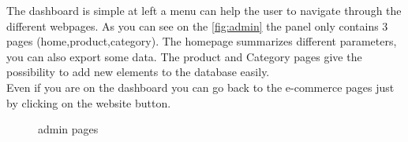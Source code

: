 \documentclass{article}
\begin{document}
The dashboard is simple at left a menu can help the user to navigate through the different webpages. As you can see on the \autoref{fig:admin} the panel only contains 3 pages (home,product,category). The homepage summarizes different parameters, you can also export some data. The product and Category pages give the possibility to add new elements to the database easily. \\

Even if you are on the dashboard you can go back to the e-commerce pages just by clicking on the website button.

\begin{figure}[h!]
    \centering
    \qquad
    \caption{admin pages}%
    \label{fig:admin}%
\end{figure}
\end{document}
